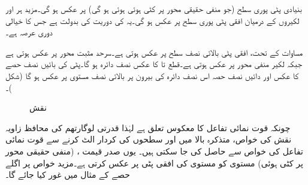 بنیادی پٹی  پوری  سطح  (جو منفی حقیقی محور پر کٹی ہوئی ہوئی ہو گی) پر عکس ہو گی۔مزید ہر  اور  لکیروں کے درمیان افقی پٹی  پوری  سطح پر عکس ہو گی۔یہ  کی دوریت کی بدولت ہے جس کا خیالی دوری عرصہ  ہے۔

مساوات  کے تحت، افقی پٹی  بالائی نصف  سطح پر عکس ہوتی ہے۔سرحد  مثبت   محور   پر عکس ہوتی ہے جبکہ لکیر  منفی  محور   پر عکس ہوتی ہے۔قطع  تا  کا عکس نصف دائرہ  ہو گا۔پٹی کی بائیں نصف  حصے کا عکس  اور دائیں نصف  حصہ  اس نصف دائرہ   کی بیرون پر بالائی نصف  مستوی پر عکس ہو گا (شکل )۔
\begin{figure}
\centering
\begin{subfigure}{0.45\textwidth}
\centering
{}
\end{subfigure}\hfill
\begin{subfigure}{0.45\textwidth}
\centering
{}
\end{subfigure} \hfill
\caption{نقش }
\label{شکل_نقش_قوت-نمائی_ب}
\end{figure}

چونکہ قوت نمائی تفاعل کا معکوس  تعلق    ہے لہٰذا قدرتی لوگارتھم کی محافظ زاویہ نقش کی خواص، متذکرہ بالا میں  اور  سطحوں کی کردار  الٹ کرنے سے  قوت نمائی تفاعل کی خواص سے حاصل کی جا سکتی ہیں۔ یوں صدر قیمت ، (منفی حقیقی محور پر کٹی ہوئی)   مستوی کو  مستوی کی افقی پٹی  پر عکس کرتی ہے۔مزید خواص پر اگلے حصے کے مثال  میں غور کیا جائے گا۔


